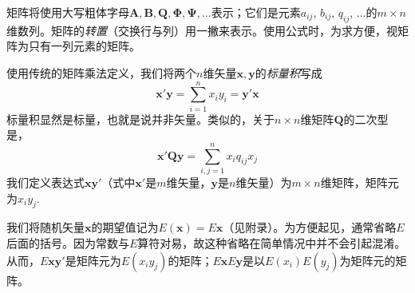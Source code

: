 \documentclass[UTF8,adobefonts]{ctexart}
\begin{document}
矩阵将使用大写粗体字母$\mathbf{A}, \mathbf{B}, \mathbf{Q}, \boldsymbol{\Phi}, \boldsymbol{\Psi}, \dotsc$表示；它们是元素$a_{ij}$, $b_{ij}$, $q_{ij}$, $\dotsc$的$m \times n$维数列。矩阵的\emph{转置}（交换行与列）用一撇来表示。使用公式时，为求方便，视矩阵为只有一列元素的矩阵。

使用传统的矩阵乘法定义，我们将两个$n$维矢量$\mathbf{x}, \mathbf{y}$的\emph{标量积}写成
\begin{equation*}
\mathbf{x'}\mathbf{y}=\sum^n_{i=1}x_i y_i=\mathbf{y'}\mathbf{x}
\end{equation*}
标量积显然是标量，也就是说并非矢量。类似的，关于$n \times n$维矩阵$\mathbf{Q}$的二次型是，
\begin{equation*}
\mathbf{x'Qy}=\sum^n_{i,j=1}x_i q_{ij} x_j
\end{equation*}
我们定义表达式$\mathbf{xy'}$（式中$\mathbf{x'}$是$m$维矢量，$\mathbf{y}$是$n$维矢量）为$m \times n$维矩阵，矩阵元为$x_i y_j$.

我们将随机矢量$\mathbf{x}$的期望值记为$E(\mathbf{x})=E\mathbf{x}$（见附录）。为方便起见，通常省略$E$后面的括号。因为常数与$E$算符对易，故这种省略在简单情况中并不会引起混淆。从而，$E\mathbf{xy'}$是矩阵元为$E(x_i y_j
)$的矩阵；$E\mathbf{x}E\mathbf{y}$是以$E(x_i)E(y_j)$为矩阵元的矩阵。
\end{document}
